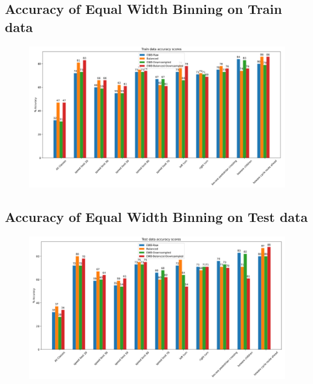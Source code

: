 \documentclass[11pt]{article}
\begin{document}
\begin{appendices}
\newpage
\subsection{Accuracy of Equal Width Binning on Train data}\label{BarChartEWBTrain}
\begin{figure}[h!]
  \centering
  \includegraphics[width=1\textwidth]{Images/BarChartEWBTrain.PNG}
\end{figure}

\subsection{Accuracy of Equal Width Binning on Test data}\label{BarChartEWBTest}
  \begin{figure}[h!] 
    \centering
    \includegraphics[scale=0.6]{images/BarChartEWBTest.PNG}
\end{figure}

\newpage

\end{appendices}
\end{document}
